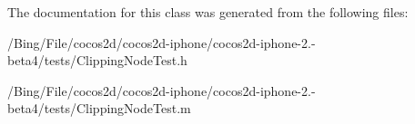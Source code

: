 The documentation for this class was generated from the following files\-:\begin{DoxyCompactItemize}
\item 
/\-Bing/\-File/cocos2d/cocos2d-\/iphone/cocos2d-\/iphone-\/2.-\/beta4/tests/Clipping\-Node\-Test.\-h\item 
/\-Bing/\-File/cocos2d/cocos2d-\/iphone/cocos2d-\/iphone-\/2.-\/beta4/tests/Clipping\-Node\-Test.\-m\end{DoxyCompactItemize}
